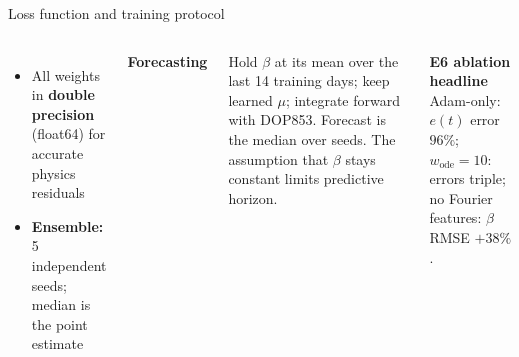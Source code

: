 \begin{frame}{Loss function and training protocol}
\begin{columns}[T,onlytextwidth]
\begin{itemize}
    \item All weights in \textbf{double precision} (float64) for accurate physics residuals
    \item \textbf{Ensemble:} 5 independent seeds; median is the point estimate
  \end{itemize}
  \vspace{4pt}
  \textbf{\color{mvPINN}Forecasting}\\
  {\footnotesize Hold $\beta$ at its mean over the last 14 training days; keep learned $\mu$; integrate forward with DOP853. Forecast is the median over seeds. The assumption that $\beta$ stays constant limits predictive horizon.\par}
  \vspace{4pt}
  \textbf{\color{mvMuted}E6 ablation headline}\\
  {\footnotesize Adam-only: $e(t)$ error $96\%$; $w_{\text{ode}}=10$: errors triple; no Fourier features: $\beta$ RMSE $+38\%$.}
\end{columns}
\end{frame}

